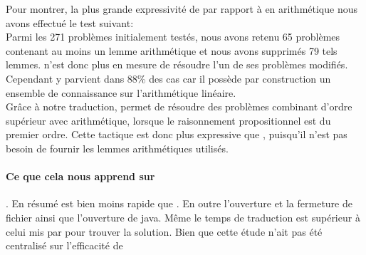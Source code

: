 Pour montrer, la plus grande expressivité de \beagletac par rapport à \metistac en arithmétique nous avons effectué le test suivant:
\\Parmi les 271 problèmes initialement testés, nous avons retenu 65 problèmes contenant au moins un lemme arithmétique et nous avons supprimés 79 tels lemmes. \metistac n'est donc plus en mesure de résoudre l'un de ses problèmes modifiés. Cependant \beagletac y parvient dans 88\% des cas car il possède par construction un ensemble de connaissance sur l'arithmétique linéaire.
\\Grâce à notre traduction, \beagletac permet de résoudre des problèmes
combinant d'ordre supérieur avec arithmétique, lorsque le raisonnement
propositionnel est du premier ordre. Cette tactique est donc plus
expressive que \metistac, puisqu'il n'est pas besoin de fournir les
lemmes arithmétiques utilisés.





\paragraph {Ce que cela nous apprend sur \beagletac}.
En résumé \beagletac est bien moins rapide que \metistac. En outre l'ouverture et la fermeture de fichier ainsi que l'ouverture de java. Même le temps de traduction est supérieur à celui mis par \metistac pour trouver la solution. Bien que cette étude n'ait pas été centralisé sur l'efficacité de \beagle
